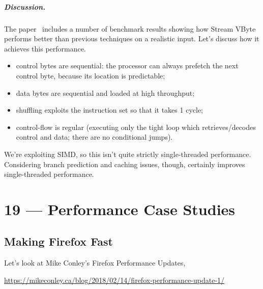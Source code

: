 \documentclass[a4paper]{report}
\begin{document}
\paragraph{Discussion.} The paper~\cite{LEMIRE20181} includes a number of benchmark results
showing how Stream VByte performs better than previous techniques on a realistic input.
Let's discuss how it achieves this performance.

\begin{itemize}[noitemsep]
\item control bytes are sequential: the processor can always prefetch the next control byte, because
its location is predictable;
\item data bytes are sequential and loaded at high throughput;
\item shuffling exploits the instruction set so that it takes 1 cycle;
\item control-flow is regular (executing only the tight loop which retrieves/decodes control
and data; there are no conditional jumps).
\end{itemize}
We're exploiting SIMD, so this isn't quite strictly single-threaded performance.
Considering branch prediction and caching issues, though,
certainly improves single-threaded performance.










\chapter*{19 --- Performance Case Studies}


\section*{Making Firefox Fast}

Let's look at Mike Conley's Firefox Performance Updates,
\begin{center}
{\scriptsize
\vspace*{-1em}
\url{https://mikeconley.ca/blog/2018/02/14/firefox-performance-update-1/}
}
\end{center}
\vspace*{-1em}
\end{document}

